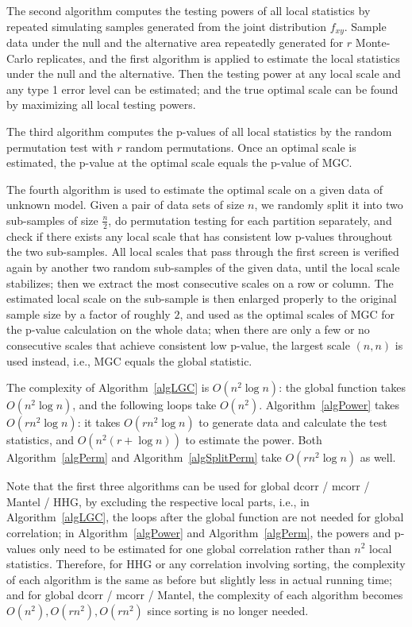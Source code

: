 \documentclass[11pt]{article}
\begin{document}
The second algorithm computes the testing powers of all local statistics by repeated simulating samples generated from the joint distribution $f_{xy}$. Sample data under the null and the alternative area repeatedly generated for $r$ Monte-Carlo replicates, and the first algorithm is applied to estimate the local statistics under the null and the alternative. Then the testing power at any local scale and any type 1 error level can be estimated; and the true optimal scale can be found by maximizing all local testing powers.

The third algorithm computes the p-values of all local statistics by the random permutation test with $r$ random permutations. Once an optimal scale is estimated, the p-value at the optimal scale equals the p-value of MGC.

The fourth algorithm is used to estimate the optimal scale on a given data of unknown model. Given a pair of data sets of size $n$, we randomly split it into two sub-samples of size $\frac{n}{2}$, do permutation testing for each partition separately, and check if there exists any local scale that has consistent low p-values throughout the two sub-samples. All local scales that pass through the first screen is verified again by another two random sub-samples of the given data, until the local scale stabilizes; then we extract the most consecutive scales on a row or column. The estimated local scale on the sub-sample is then enlarged properly to the original sample size by a factor of roughly $2$, and used as the optimal scales of MGC for the p-value calculation on the whole data; when there are only a few or no consecutive scales that achieve consistent low p-value, the largest scale $(n,n)$ is used instead, i.e., MGC equals the global statistic.

The complexity of Algorithm~\ref{algLGC} is $O(n^2 \log n)$: the global function takes $O(n^2 \log n)$, and the following loops take $O(n^2)$. Algorithm~\ref{algPower} takes $O(rn^2 \log n)$: it takes $O(rn^2 \log n)$ to generate data and calculate the test statistics, and $O(n^2 (r+\log n))$ to estimate the power. Both Algorithm~\ref{algPerm} and Algorithm~\ref{algSplitPerm} take $O(rn^2 \log n)$ as well. 

Note that the first three algorithms can be used for global dcorr / mcorr / Mantel / HHG, by excluding the respective local parts, i.e., in Algorithm~\ref{algLGC}, the loops after the global function are not needed for global correlation; in Algorithm~\ref{algPower} and Algorithm~\ref{algPerm}, the powers and p-values only need to be estimated for one global correlation rather than $n^2$ local statistics. Therefore, for HHG or any correlation involving sorting, the complexity of each algorithm is the same as before but slightly less in actual running time; and for global dcorr / mcorr / Mantel, the complexity of each algorithm becomes $O(n^2), O(rn^2), O(rn^2)$ since sorting is no longer needed.
\end{document}

